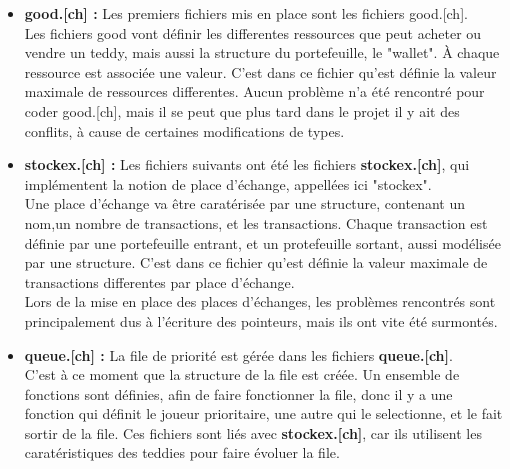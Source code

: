 \documentclass{article}
\begin{document}
\begin{itemize}

\item\textbf{good.[ch] :} Les premiers fichiers mis en place sont les fichiers good.[ch].\\
Les fichiers good vont d\'efinir les differentes ressources que peut acheter ou vendre un teddy, mais aussi la structure du portefeuille, le "wallet". 
\`A chaque ressource est associ\'ee une valeur.
C'est dans ce fichier qu'est d\'efinie la valeur maximale de ressources differentes.
Aucun probl\`eme n'a \'et\'e rencontr\'e pour coder good.[ch], mais il se peut que plus tard dans le projet il y ait des conflits, \`a cause de certaines modifications de types. 

\item\textbf{stockex.[ch] :}  Les fichiers suivants ont \'et\'e les fichiers \textbf{stockex.[ch]}, qui impl\'ementent la notion de place d'\'echange, appell\'ees ici "stockex".\\
Une place d'\'echange va \^etre carat\'eris\'ee par une structure, contenant un nom,un nombre de transactions, et les transactions. 
Chaque transaction est d\'efinie par une portefeuille entrant, et un protefeuille sortant, aussi mod\'elis\'ee par une structure.
C'est dans ce fichier qu'est d\'efinie la valeur maximale de transactions differentes par place d'\'echange.\\
Lors de la mise en place des places d'\'echanges, les probl\`emes rencontr\'es sont principalement dus \`a l'\'ecriture des pointeurs, mais ils ont vite \'et\'e surmont\'es.


\vspace*{10mm}

\item\textbf{queue.[ch] :} La file de priorit\'e est g\'er\'ee dans les fichiers \textbf{queue.[ch]}.\\
C'est \`a ce moment que la structure de la file est cr\'e\'ee.
Un ensemble de fonctions sont d\'efinies, afin de faire fonctionner la file, donc il y a une fonction qui d\'efinit le joueur prioritaire, une autre qui le selectionne,
et le fait sortir de la file.
Ces fichiers sont li\'es avec \textbf{stockex.[ch]}, car ils utilisent les carat\'eristiques des teddies pour faire \'evoluer la file.


\end{itemize}
\end{document}
